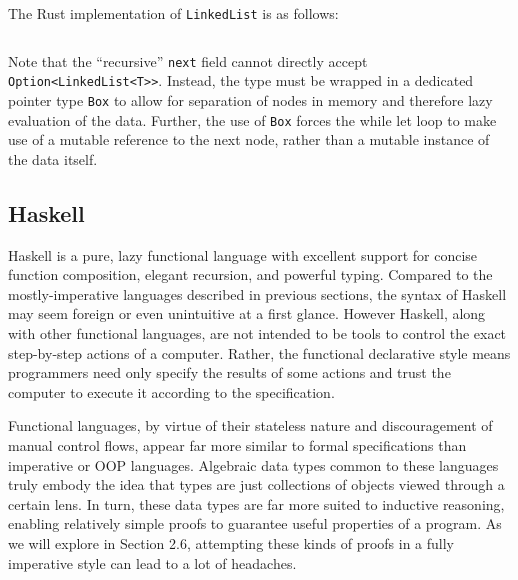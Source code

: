 \documentclass{article}
\begin{document}
The Rust implementation of \texttt{LinkedList} is as follows:
\inputminted{rust}{linked_list/main.rs}
Note that the ``recursive'' \texttt{next} field cannot directly accept \texttt{Option<LinkedList<T>>}.
Instead, the type must be wrapped in a dedicated pointer type \texttt{Box} to allow for separation of nodes in memory
and therefore lazy evaluation of the data. Further, the use of \texttt{Box} forces the while let loop to
make use of a mutable reference to the next node, rather than a mutable instance of the data itself.


\subsection{Haskell}

Haskell is a pure, lazy functional language with excellent support for concise function composition, elegant recursion, and powerful typing.
Compared to the mostly-imperative languages described in previous sections, the syntax of Haskell may seem foreign
or even unintuitive at a first glance. However Haskell, along with other functional languages, are not intended
to be tools to control the exact step-by-step actions of a computer. Rather, the functional declarative style means programmers need only
specify the results of some actions and trust the computer to execute it according to the specification.

Functional languages, by virtue of their stateless nature and discouragement of manual control flows, appear
far more similar to formal specifications than imperative or OOP languages. Algebraic data types common to these
languages truly embody the idea that types are just collections of objects viewed through a certain lens.
In turn, these data types are far more suited to inductive reasoning, enabling relatively simple proofs to
guarantee useful properties of a program. As we will explore in Section 2.6, attempting these kinds of proofs
in a fully imperative style can lead to a lot of headaches.
\end{document}
